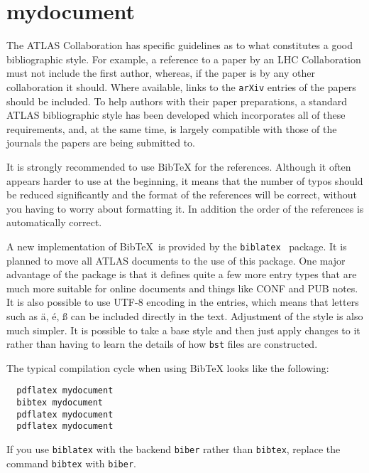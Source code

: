 \documentclass[UKenglish]{latex/atlasdoc}
\author{Ian C. Brock}
\affil{University of Bonn}
\newcommand*{\BibTeX}{Bib\TeX}
\newcommand{\Package}[1]{\texttt{#1}\xspace}
\begin{document}
 


\section{mydocument}

The ATLAS Collaboration has specific guidelines as to what constitutes a good bibliographic style. 
For example, a reference to a paper by an LHC Collaboration must not include the first author,
whereas, if the paper is by any other collaboration it should. 
Where available, links to the \texttt{arXiv} entries of the papers should be included. 
To help authors with their paper preparations,
a standard ATLAS bibliographic style has been developed which incorporates all of these requirements, 
and, at the same time, is largely compatible with those of the journals the papers are being submitted to. 

It is strongly recommended to use \BibTeX{} for the references. 
Although it often appears harder to use at the beginning, it means that the number of
typos should be reduced significantly and the format of the references
will be correct, without you having to worry about formatting it.
In addition the order of the references is automatically correct.

A new implementation of \BibTeX\ is provided by the \texttt{biblatex}~\cite{biblatex} package.
It is planned to move all ATLAS documents to the use of this package.
One major advantage of the package is that it defines quite a few more entry types
that are much more suitable for online documents and things like CONF and PUB notes.
It is also possible to use UTF-8 encoding in the entries, which means that letters such as
ä, é, ß can be included directly in the text.
Adjustment of the style is also much simpler.
It is possible to take a base style and then just apply changes to it rather than
having to learn the details of how \texttt{bst} files are constructed.

The typical compilation cycle when using \BibTeX{} looks like the following:
%
\begin{verbatim}
  pdflatex mydocument
  bibtex mydocument
  pdflatex mydocument
  pdflatex mydocument
\end{verbatim}
If you use \Package{biblatex} with the backend \Package{biber} rather than \Package{bibtex}, replace the command
\texttt{bibtex} with \texttt{biber}.
\end{document}
